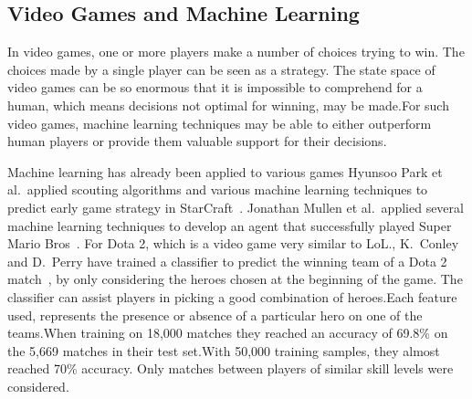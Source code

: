 \subsection{Video Games and Machine Learning}\label{sec:mlandonlinevideogames}
In video games, one or more players make a number of choices trying to win. The choices made by a single player can be seen as a strategy. The state space of video games can be so enormous that it is impossible to comprehend for a human, which means decisions not optimal for winning, may be made.For such video games, machine learning techniques may be able to either outperform human players or provide them valuable support for their decisions.

Machine learning has already been applied to various games Hyunsoo Park et al.\ applied scouting algorithms and various machine learning techniques to predict early game strategy in StarCraft~\cite{Park:2012:PES:2425296.2425298}. Jonathan Mullen et al.\ applied several machine learning techniques to develop an agent that successfully played Super Mario Bros~\cite{supermario}. For Dota 2, which is a video game very similar to LoL.\@, K.\ Conley and D.\ Perry have trained a classifier to predict the winning team of a Dota 2 match~\cite{dota2article}, by only considering the heroes chosen at the beginning of the game. The classifier can assist players in picking a good combination of heroes.Each feature used, represents the presence or absence of a particular hero on one of the teams.When training on 18,000 matches they reached an accuracy of 69.8\% on the 5,669 matches in their test set.With 50,000 training samples, they almost reached 70\% accuracy. Only matches between players of similar skill levels were considered.

%
%



